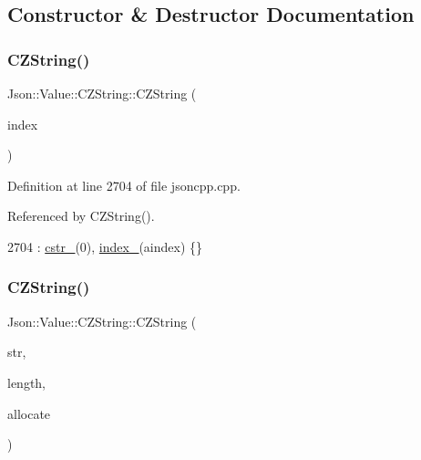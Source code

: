 \subsection{Constructor \& Destructor Documentation}
\mbox{\label{class_json_1_1_value_1_1_c_z_string_a4b8aa6eaabdec78cffec96e088da996f}} 
\subsubsection{\texorpdfstring{C\+Z\+String()}{CZString()}\hspace{0.1cm}{\footnotesize\ttfamily [1/3]}}
{\footnotesize\ttfamily Json\+::\+Value\+::\+C\+Z\+String\+::\+C\+Z\+String (\begin{DoxyParamCaption}\item[{\hyperlink{class_json_1_1_value_a184a91566cccca7b819240f0d5561c7d}{Array\+Index}}]{index }\end{DoxyParamCaption})}



Definition at line 2704 of file jsoncpp.\+cpp.



Referenced by C\+Z\+String().


\begin{DoxyCode}
2704 : \hyperlink{class_json_1_1_value_1_1_c_z_string_a5b4d28349294034d7f779c3c95d0306c}{cstr\_}(0), \hyperlink{class_json_1_1_value_1_1_c_z_string_aecf29982235c9c165a0971023ebbb270}{index\_}(aindex) \{\}
\end{DoxyCode}
\mbox{\label{class_json_1_1_value_1_1_c_z_string_a86a86eaf0cf26d4c861d0daa359d608a}} 
\subsubsection{\texorpdfstring{C\+Z\+String()}{CZString()}\hspace{0.1cm}{\footnotesize\ttfamily [2/3]}}
{\footnotesize\ttfamily Json\+::\+Value\+::\+C\+Z\+String\+::\+C\+Z\+String (\begin{DoxyParamCaption}\item[{char const $\ast$}]{str,  }\item[{unsigned}]{length,  }\item[{\hyperlink{class_json_1_1_value_1_1_c_z_string_a2805c46fb4a72bbaed55de6d75941b6d}{Duplication\+Policy}}]{allocate }\end{DoxyParamCaption})}



